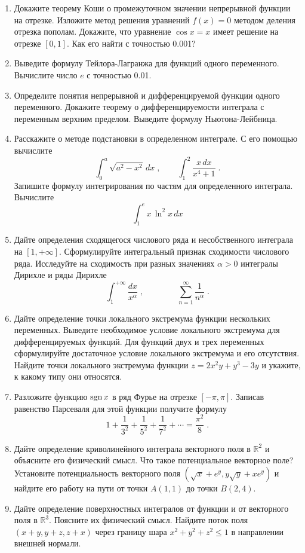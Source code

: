 %
%

\begin{enumerate}[resume]
\item Докажите теорему Коши о промежуточном значении непрерывной функции на отрезке. Изложите метод решения уравнений $f(x) = 0$ методом деления отрезка пополам. Докажите, что уравнение $\cos{x} = x$ имеет решение на отрезке $[0, 1]$. Как его найти с точностью 0.001?

\item Выведите формулу Тейлора-Лагранжа для функций одного переменного. Вычислите число $e$ с точностью 0.01. 

\item Определите понятия непрерывной и дифференцируемой функции одного переменного. Докажите теорему о дифференцируемости интеграла с переменным верхним пределом. Выведите формулу Ньютона-Лейбница.

\item Расскажите о методе подстановки в определенном интеграле. С его помощью вычислите 
$$
\int_0^a\!\sqrt{a^2 - x^2}\, dx\;, \qquad \int_1^2\! \frac{x\,dx}{x^4 + 1}\;.
$$
Запишите формулу интегрирования по частям для определенного интеграла. Вычислите 
$$
\int_1^e\! x\, \ln^2{x} \, dx
$$

\item Дайте определения сходящегося числового ряда и несобственного интеграла на $[1, +\infty]$. Сформулируйте интегральный признак сходимости числового ряда. Исследуйте на сходимость при разных значениях $\alpha > 0$ интегралы Дирихле и ряды Дирихле
$$
\int_1^{+\infty}\! \frac{dx}{x^\alpha} \;,\qquad\qquad
%
\sum_{n=1}^{\infty} \frac{1}{n^\alpha} \;.
$$

\item Дайте определение точки локального экстремума функции нескольких переменных. Выведите необходимое условие локального экстремума для дифференцируемых функций. Для функций двух и трех переменных сформулируйте достаточное условие локального экстремума и его отсутствия. Найдите точки локального экстремума функции $z = 2x^2 y + y^3 - 3y$ и укажите, к какому типу они относятся.

\item Разложите функцию $\operatorname{sgn}{x}$ в ряд Фурье на отрезке $[-\pi, \pi]$. Записав равенство Парсеваля для этой функции получите формулу
$$
1 + \frac{1}{3^2} + \frac{1}{5^2} + \frac{1}{7^2} + \cdots = \frac{\pi^2}{8} \;.
$$

\item Дайте определение криволинейного интеграла векторного поля в $\mathbb{R}^2$ и объясните его физический смысл. Что такое потенциальное векторное поле? Установите потенциальность векторного поля $(\sqrt{x} + e^y, y\sqrt{y} + x e^y)$ и найдите его работу на пути от точки $A(1, 1)$ до точки $B(2, 4)$.


\item Дайте определение поверхностных интегралов от функции и от векторного поля в $\mathbb{R}^3$. Поясните их физический смысл. Найдите поток поля $(x + y, y+z, z+x)$ через границу шара $x^2 + y^2 + z^2 \leqslant 1$ в направлении внешней нормали.


\end{enumerate}



